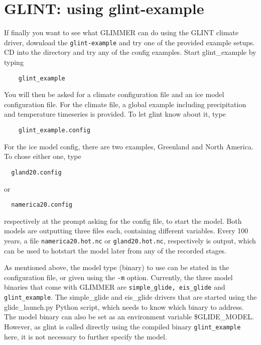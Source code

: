 
\section{GLINT: using glint-example}
If finally you want to see what GLIMMER can do using the GLINT climate driver,
download the \texttt{glint-example} and try one of the provided example setups.
CD into the directory and try any of the config examples. Start glint\_example
by typing
\begin{verbatim}
    glint_example
\end{verbatim}
You will then be asked for a climate configuration file and an ice model 
configuration file.
For the climate file, a global example including precipitation and temperature timeseries
is provided. To let glint know about it, type
\begin{verbatim}
    glint_example.config
\end{verbatim}
For the ice model config, there are two examples, Greenland and North America. To chose either one, type
\begin{verbatim}
  gland20.config
\end{verbatim}
or
\begin{verbatim}
  namerica20.config
\end{verbatim}
respectively at the prompt asking for the config file, to start the model.
Both models are outputting three files each, containing different variables.
Every 100 years, a file \texttt{namerica20.hot.nc} or \texttt{gland20.hot.nc}, respectively is output, 
which can be used to hotstart the model later from any of the recorded stages.

As mentioned above, the model type (binary) to use can be stated in the configuration file,
or given using the \texttt{-m} option. Currently, the three model binaries that
come with GLIMMER are \texttt{simple\_glide, eis\_glide} and
\texttt{glint\_example}. The simple\_glide and eis\_glide drivers that are started using the glide\_launch.py Python script,
which needs to know which binary to address. The model binary can also be set as an environment variable \$GLIDE\_MODEL. 
However, as glint is called directly using the compiled binary \texttt{glint\_example} here, it is not necessary to further 
specify the model.
